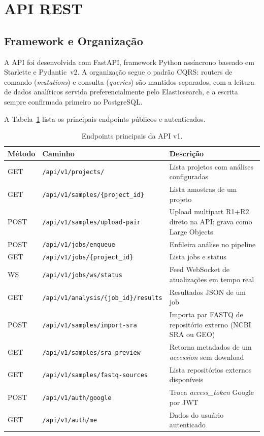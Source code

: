 \section{API REST}

\subsection{Framework e Organização}

A API foi desenvolvida com FastAPI, framework Python assíncrono
baseado em Starlette e Pydantic~v2. A organização segue o padrão
CQRS: routers de comando (\textit{mutations}) e consulta
(\textit{queries}) são mantidos separados, com a leitura de dados
analíticos servida preferencialmente pelo Elasticsearch, e a escrita
sempre confirmada primeiro no PostgreSQL.

A Tabela~\ref{tab:endpoints} lista os principais endpoints públicos
e autenticados.

\begin{table}[H]
\centering
\caption{Endpoints principais da API v1.}
\label{tab:endpoints}
\begin{tabularx}{\textwidth}{llX}
\toprule
\textbf{Método} & \textbf{Caminho} & \textbf{Descrição} \\
\midrule
GET  & \texttt{/api/v1/projects/}              & Lista projetos com análises configuradas \\
GET  & \texttt{/api/v1/samples/\{project\_id\}} & Lista amostras de um projeto \\
POST & \texttt{/api/v1/samples/upload-pair}     & Upload multipart R1+R2 direto na API; grava como Large Objects \\
POST & \texttt{/api/v1/jobs/enqueue}            & Enfileira análise no pipeline \\
GET  & \texttt{/api/v1/jobs/\{project\_id\}}    & Lista jobs e status \\
WS   & \texttt{/api/v1/jobs/ws/status}          & Feed WebSocket de atualizações em tempo real \\
GET  & \texttt{/api/v1/analysis/\{job\_id\}/results} & Resultados JSON de um job \\
POST & \texttt{/api/v1/samples/import-sra}       & Importa par FASTQ de repositório externo (NCBI SRA ou GEO) \\
GET  & \texttt{/api/v1/samples/sra-preview}     & Retorna metadados de um \textit{accession} sem download \\
GET  & \texttt{/api/v1/samples/fastq-sources}   & Lista repositórios externos disponíveis \\
POST & \texttt{/api/v1/auth/google}             & Troca \textit{access\_token} Google por JWT \\
GET  & \texttt{/api/v1/auth/me}                 & Dados do usuário autenticado \\
\bottomrule
\end{tabularx}
\end{table}

